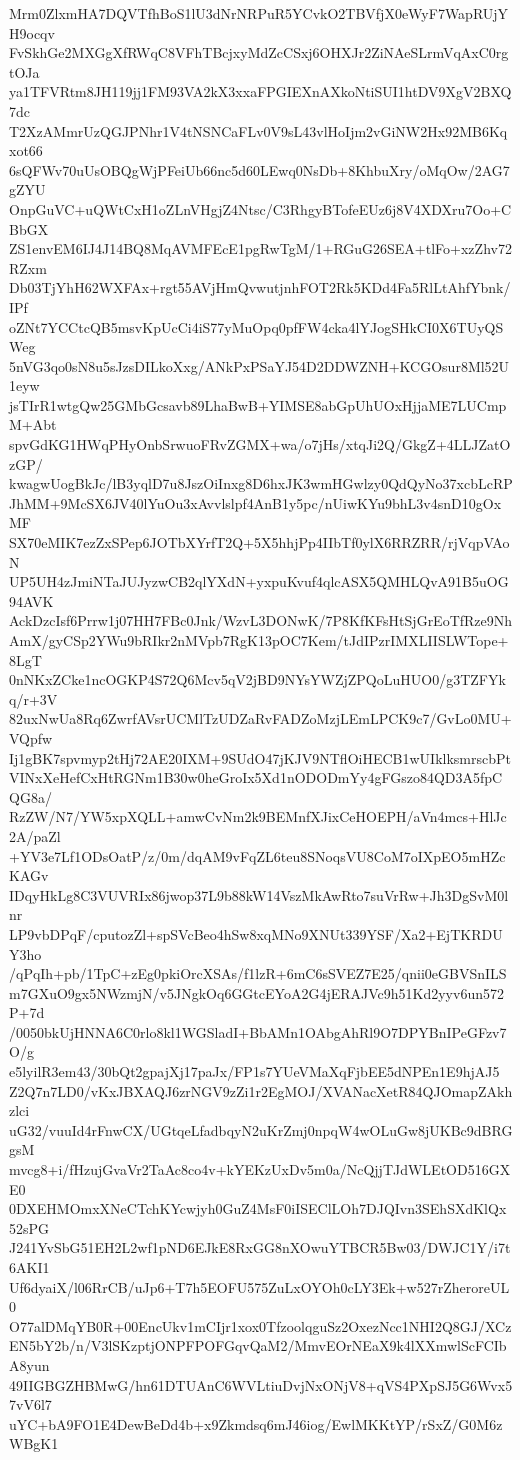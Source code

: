 Mrm0ZlxmHA7DQVTfhBoS1lU3dNrNRPuR5YCvkO2TBVfjX0eWyF7WapRUjYH9ocqv
FvSkhGe2MXGgXfRWqC8VFhTBcjxyMdZcCSxj6OHXJr2ZiNAeSLrmVqAxC0rgtOJa
ya1TFVRtm8JH119jj1FM93VA2kX3xxaFPGIEXnAXkoNtiSUI1htDV9XgV2BXQ7dc
T2XzAMmrUzQGJPNhr1V4tNSNCaFLv0V9sL43vlHoIjm2vGiNW2Hx92MB6Kqxot66
6sQFWv70uUsOBQgWjPFeiUb66nc5d60LEwq0NsDb+8KhbuXry/oMqOw/2AG7gZYU
OnpGuVC+uQWtCxH1oZLnVHgjZ4Ntsc/C3RhgyBTofeEUz6j8V4XDXru7Oo+CBbGX
ZS1envEM6IJ4J14BQ8MqAVMFEcE1pgRwTgM/1+RGuG26SEA+tlFo+xzZhv72RZxm
Db03TjYhH62WXFAx+rgt55AVjHmQvwutjnhFOT2Rk5KDd4Fa5RlLtAhfYbnk/IPf
oZNt7YCCtcQB5msvKpUcCi4iS77yMuOpq0pfFW4cka4lYJogSHkCI0X6TUyQSWeg
5nVG3qo0sN8u5sJzsDILkoXxg/ANkPxPSaYJ54D2DDWZNH+KCGOsur8Ml52U1eyw
jsTIrR1wtgQw25GMbGcsavb89LhaBwB+YIMSE8abGpUhUOxHjjaME7LUCmpM+Abt
spvGdKG1HWqPHyOnbSrwuoFRvZGMX+wa/o7jHs/xtqJi2Q/GkgZ+4LLJZatOzGP/
kwagwUogBkJc/lB3yqlD7u8JszOiInxg8D6hxJK3wmHGwlzy0QdQyNo37xcbLcRP
JhMM+9McSX6JV40lYuOu3xAvvlslpf4AnB1y5pc/nUiwKYu9bhL3v4snD10gOxMF
SX70eMIK7ezZxSPep6JOTbXYrfT2Q+5X5hhjPp4IIbTf0ylX6RRZRR/rjVqpVAoN
UP5UH4zJmiNTaJUJyzwCB2qlYXdN+yxpuKvuf4qlcASX5QMHLQvA91B5uOG94AVK
AckDzcIsf6Prrw1j07HH7FBc0Jnk/WzvL3DONwK/7P8KfKFsHtSjGrEoTfRze9Nh
AmX/gyCSp2YWu9bRIkr2nMVpb7RgK13pOC7Kem/tJdIPzrIMXLIISLWTope+8LgT
0nNKxZCke1ncOGKP4S72Q6Mcv5qV2jBD9NYsYWZjZPQoLuHUO0/g3TZFYkq/r+3V
82uxNwUa8Rq6ZwrfAVsrUCMlTzUDZaRvFADZoMzjLEmLPCK9c7/GvLo0MU+VQpfw
Ij1gBK7spvmyp2tHj72AE20IXM+9SUdO47jKJV9NTflOiHECB1wUIklksmrscbPt
VINxXeHefCxHtRGNm1B30w0heGroIx5Xd1nODODmYy4gFGszo84QD3A5fpCQG8a/
RzZW/N7/YW5xpXQLL+amwCvNm2k9BEMnfXJixCeHOEPH/aVn4mcs+HlJc2A/paZl
+YV3e7Lf1ODsOatP/z/0m/dqAM9vFqZL6teu8SNoqsVU8CoM7oIXpEO5mHZcKAGv
IDqyHkLg8C3VUVRIx86jwop37L9b88kW14VszMkAwRto7suVrRw+Jh3DgSvM0lnr
LP9vbDPqF/cputozZl+spSVcBeo4hSw8xqMNo9XNUt339YSF/Xa2+EjTKRDUY3ho
/qPqIh+pb/1TpC+zEg0pkiOrcXSAs/f1lzR+6mC6sSVEZ7E25/qnii0eGBVSnILS
m7GXuO9gx5NWzmjN/v5JNgkOq6GGtcEYoA2G4jERAJVc9h51Kd2yyv6un572P+7d
/0050bkUjHNNA6C0rlo8kl1WGSladI+BbAMn1OAbgAhRl9O7DPYBnIPeGFzv7O/g
e5lyilR3em43/30bQt2gpajXj17paJx/FP1s7YUeVMaXqFjbEE5dNPEn1E9hjAJ5
Z2Q7n7LD0/vKxJBXAQJ6zrNGV9zZi1r2EgMOJ/XVANacXetR84QJOmapZAkhzlci
uG32/vuuId4rFnwCX/UGtqeLfadbqyN2uKrZmj0npqW4wOLuGw8jUKBc9dBRGgsM
mvcg8+i/fHzujGvaVr2TaAc8co4v+kYEKzUxDv5m0a/NcQjjTJdWLEtOD516GXE0
0DXEHMOmxXNeCTchKYcwjyh0GuZ4MsF0iISEClLOh7DJQIvn3SEhSXdKlQx52sPG
J241YvSbG51EH2L2wf1pND6EJkE8RxGG8nXOwuYTBCR5Bw03/DWJC1Y/i7t6AKI1
Uf6dyaiX/l06RrCB/uJp6+T7h5EOFU575ZuLxOYOh0cLY3Ek+w527rZheroreUL0
O77alDMqYB0R+00EncUkv1mCIjr1xox0TfzoolqguSz2OxezNcc1NHI2Q8GJ/XCz
EN5bY2b/n/V3lSKzptjONPFPOFGqvQaM2/MmvEOrNEaX9k4lXXmwlScFCIbA8yun
49IIGBGZHBMwG/hn61DTUAnC6WVLtiuDvjNxONjV8+qVS4PXpSJ5G6Wvx57vV6l7
uYC+bA9FO1E4DewBeDd4b+x9Zkmdsq6mJ46iog/EwlMKKtYP/rSxZ/G0M6zWBgK1
